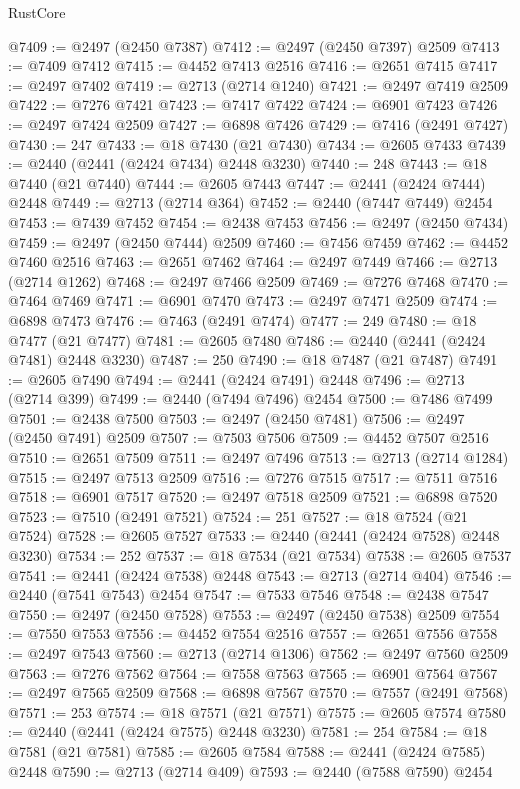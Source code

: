 \begin{lexlean}{RustCore}
\begin{coremodule}
@7409 := @2497 (@2450 @7387)
@7412 := @2497 (@2450 @7397) @2509
@7413 := @7409 @7412
@7415 := @4452 @7413 @2516
@7416 := @2651 @7415
@7417 := @2497 @7402
@7419 := @2713 (@2714 @1240)
@7421 := @2497 @7419 @2509
@7422 := @7276 @7421
@7423 := @7417 @7422
@7424 := @6901 @7423
@7426 := @2497 @7424 @2509
@7427 := @6898 @7426
@7429 := @7416 (@2491 @7427)
@7430 := 247
@7433 := @18 @7430 (@21 @7430)
@7434 := @2605 @7433
@7439 := @2440 (@2441 (@2424 @7434) @2448 @3230)
@7440 := 248
@7443 := @18 @7440 (@21 @7440)
@7444 := @2605 @7443
@7447 := @2441 (@2424 @7444) @2448
@7449 := @2713 (@2714 @364)
@7452 := @2440 (@7447 @7449) @2454
@7453 := @7439 @7452
@7454 := @2438 @7453
@7456 := @2497 (@2450 @7434)
@7459 := @2497 (@2450 @7444) @2509
@7460 := @7456 @7459
@7462 := @4452 @7460 @2516
@7463 := @2651 @7462
@7464 := @2497 @7449
@7466 := @2713 (@2714 @1262)
@7468 := @2497 @7466 @2509
@7469 := @7276 @7468
@7470 := @7464 @7469
@7471 := @6901 @7470
@7473 := @2497 @7471 @2509
@7474 := @6898 @7473
@7476 := @7463 (@2491 @7474)
@7477 := 249
@7480 := @18 @7477 (@21 @7477)
@7481 := @2605 @7480
@7486 := @2440 (@2441 (@2424 @7481) @2448 @3230)
@7487 := 250
@7490 := @18 @7487 (@21 @7487)
@7491 := @2605 @7490
@7494 := @2441 (@2424 @7491) @2448
@7496 := @2713 (@2714 @399)
@7499 := @2440 (@7494 @7496) @2454
@7500 := @7486 @7499
@7501 := @2438 @7500
@7503 := @2497 (@2450 @7481)
@7506 := @2497 (@2450 @7491) @2509
@7507 := @7503 @7506
@7509 := @4452 @7507 @2516
@7510 := @2651 @7509
@7511 := @2497 @7496
@7513 := @2713 (@2714 @1284)
@7515 := @2497 @7513 @2509
@7516 := @7276 @7515
@7517 := @7511 @7516
@7518 := @6901 @7517
@7520 := @2497 @7518 @2509
@7521 := @6898 @7520
@7523 := @7510 (@2491 @7521)
@7524 := 251
@7527 := @18 @7524 (@21 @7524)
@7528 := @2605 @7527
@7533 := @2440 (@2441 (@2424 @7528) @2448 @3230)
@7534 := 252
@7537 := @18 @7534 (@21 @7534)
@7538 := @2605 @7537
@7541 := @2441 (@2424 @7538) @2448
@7543 := @2713 (@2714 @404)
@7546 := @2440 (@7541 @7543) @2454
@7547 := @7533 @7546
@7548 := @2438 @7547
@7550 := @2497 (@2450 @7528)
@7553 := @2497 (@2450 @7538) @2509
@7554 := @7550 @7553
@7556 := @4452 @7554 @2516
@7557 := @2651 @7556
@7558 := @2497 @7543
@7560 := @2713 (@2714 @1306)
@7562 := @2497 @7560 @2509
@7563 := @7276 @7562
@7564 := @7558 @7563
@7565 := @6901 @7564
@7567 := @2497 @7565 @2509
@7568 := @6898 @7567
@7570 := @7557 (@2491 @7568)
@7571 := 253
@7574 := @18 @7571 (@21 @7571)
@7575 := @2605 @7574
@7580 := @2440 (@2441 (@2424 @7575) @2448 @3230)
@7581 := 254
@7584 := @18 @7581 (@21 @7581)
@7585 := @2605 @7584
@7588 := @2441 (@2424 @7585) @2448
@7590 := @2713 (@2714 @409)
@7593 := @2440 (@7588 @7590) @2454

\end{coremodule}
\end{lexlean}
